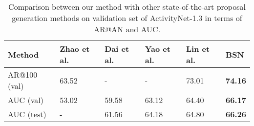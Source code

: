 \documentclass[runningheads]{llncs}
\begin{document}
\begin{table}[tbp]
\setlength{\abovecaptionskip}{-0.05cm} %
\setlength{\belowcaptionskip}{-0.1cm} %
\centering
\caption{ Comparison between our method with other state-of-the-art proposal generation methods on validation set of  ActivityNet-1.3 in terms of AR@AN and AUC. }
\small
\begin{tabular}{m{2.1cm}m{2.0cm}<{\centering}m{1.9cm}<{\centering}m{1.9cm}<{\centering}m{1.9cm}<{\centering}m{1.3cm}<{\centering}}
\toprule
Method  & Zhao et al. \cite{zhao2017temporal} & Dai et al. \cite{dai2017temporal}   & Yao et al. \cite{ghanem2017activitynet} & Lin et al. \cite{lin2017temporal}   &  BSN \\
\hline
AR@100 (val)  	& 63.52  	& -		& - 		&  73.01		& {\bf 74.16}  \\
AUC (val) 		& 53.02  	& 59.58 	& 63.12 	&  64.40 	& {\bf 66.17	} \\
AUC (test) 		& -  		& 61.56	& 64.18 	&  64.80 	& {\bf 66.26}  \\
\bottomrule
\end{tabular}
\label{table_comparison_1}
\vspace{-0.5cm}
\end{table}
\end{document}
